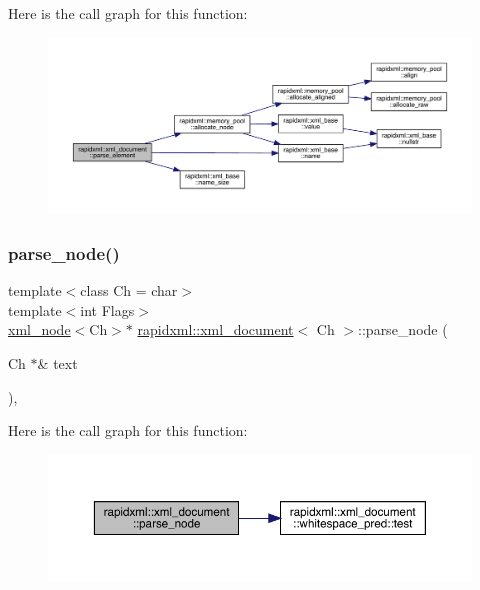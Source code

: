 Here is the call graph for this function\+:\nopagebreak
\begin{figure}[H]
\begin{center}
\leavevmode
\includegraphics[width=350pt]{classrapidxml_1_1xml__document_aea385acd096ab200d63a777d53435ada_cgraph}
\end{center}
\end{figure}
\mbox{\label{classrapidxml_1_1xml__document_a5e94cbc9b02e864cb80961ddb8cc63a7}} 
\subsubsection{\texorpdfstring{parse\_node()}{parse\_node()}}
{\footnotesize\ttfamily template$<$class Ch = char$>$ \\
template$<$int Flags$>$ \\
\mbox{\hyperlink{classrapidxml_1_1xml__node}{xml\+\_\+node}}$<$Ch$>$$\ast$ \mbox{\hyperlink{classrapidxml_1_1xml__document}{rapidxml\+::xml\+\_\+document}}$<$ Ch $>$\+::parse\+\_\+node (\begin{DoxyParamCaption}\item[{Ch $\ast$\&}]{text }\end{DoxyParamCaption})\hspace{0.3cm}{\ttfamily [inline]}, {\ttfamily [private]}}

Here is the call graph for this function\+:\nopagebreak
\begin{figure}[H]
\begin{center}
\leavevmode
\includegraphics[width=350pt]{classrapidxml_1_1xml__document_a5e94cbc9b02e864cb80961ddb8cc63a7_cgraph}
\end{center}
\end{figure}
\mbox{\label{classrapidxml_1_1xml__document_ac0b3cd07b3d5cbaa83762a196c681519}} 

